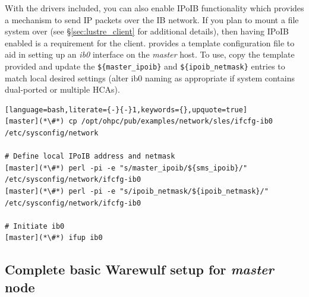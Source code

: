 \documentclass[letterpaper]{article}
\begin{document}
With the \InfiniBand{} drivers included, you can also enable IPoIB functionality
which provides a mechanism to send IP packets over the IB network. If you plan
to mount a \Lustre{} file system over \InfiniBand{} (see \S\ref{sec:lustre_client}
for additional details), then having IPoIB enabled is a requirement for the
\Lustre{} client. \OHPC{} provides a template configuration file to aid in setting up
an {\em ib0} interface on the {\em master} host. To use, copy the template
provided and update the \texttt{\$\{master\_ipoib\}} and
\texttt{\$\{ipoib\_netmask\}} entries to match local desired settings (alter ib0
naming as appropriate if system contains dual-ported or multiple HCAs). 

\begin{lstlisting}[language=bash,literate={-}{-}1,keywords={},upquote=true]
[master](*\#*) cp /opt/ohpc/pub/examples/network/sles/ifcfg-ib0 /etc/sysconfig/network

# Define local IPoIB address and netmask
[master](*\#*) perl -pi -e "s/master_ipoib/${sms_ipoib}/" /etc/sysconfig/network/ifcfg-ib0
[master](*\#*) perl -pi -e "s/ipoib_netmask/${ipoib_netmask}/" /etc/sysconfig/network/ifcfg-ib0

# Initiate ib0
[master](*\#*) ifup ib0
\end{lstlisting}

\subsection{Complete basic Warewulf setup for {\em master} node} \label{sec:setup_ww}


\end{document}
